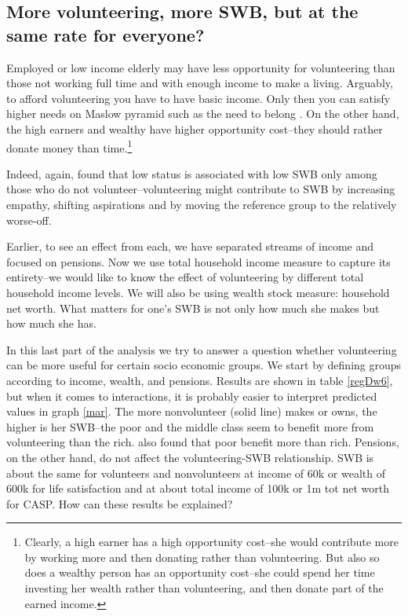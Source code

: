 \documentclass[10pt, letterpaper]{article}
\begin{document}
\begin{spacing}{1.4}
\section*{More volunteering, more SWB, but at the same rate for everyone?}

 Employed or low income elderly may have less opportunity for
 volunteering than those not working full time and with enough income to make a
 living. %
%
Arguably, to afford volunteering you have to have basic income. Only then you can
satisfy  higher needs on Maslow pyramid  such as the need to belong
\citep{maslow87}. On the other hand, the high earners and wealthy have higher
opportunity cost--they should rather donate money than time.\footnote{Clearly, a
high earner has a high opportunity cost--she would contribute more by working
more and then donating rather than volunteering. But also so does a wealthy
person has an opportunity cost--she could spend her time investing her wealth
rather than volunteering, and then donate part of the earned income.}

Indeed, again, \citet{borgonovi2008doing} found that low status is associated
with low SWB only among those who do not volunteer--volunteering
might contribute to SWB by increasing empathy, shifting aspirations and by
moving the reference group to the relatively worse-off.

Earlier,  to see an effect from each, we have separated streams of income and focused on pensions. 
Now we use total household income measure to capture its entirety--we would
like to know the effect of volunteering by different total household income
levels. We will also be using wealth stock measure: household net worth.
%
What matters for one's SWB is not only how much she makes but how much she has.

In this last part of the analysis we try to answer a question whether
volunteering can be more useful for certain socio economic groups. %
 We start by defining groups according to income, wealth, and pensions.  
 Results are shown in table \ref{regDw6}, but when it comes to interactions, it
 is probably easier to interpret predicted values in graph \ref{mar}.
The more nonvolunteer (solid line) makes or owns, the higher is her SWB--the poor and the middle
class seem to benefit more from volunteering than the rich. \citet{dulin2012volunteering} also found that poor benefit more than rich. Pensions, on the
other hand, do not affect the volunteering-SWB relationship.
%
SWB is about the same for volunteers and nonvolunteers at income of 60k or
wealth of 600k for life satisfaction and 
at about total income of 100k or 1m tot net worth for CASP.  
% 
How can these results be explained?


\end{spacing}
\end{document}
